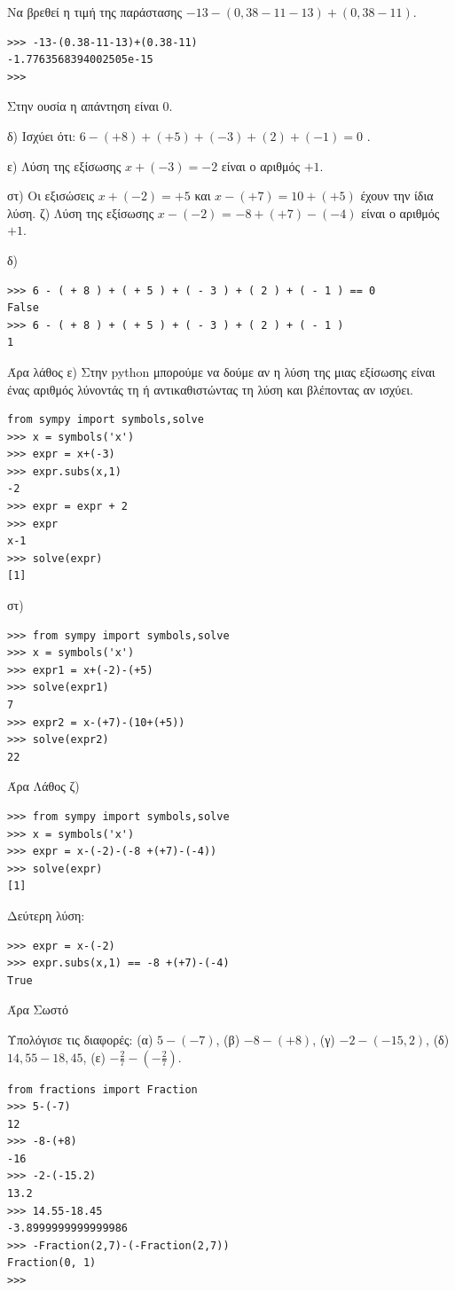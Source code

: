 \begin{exercise}
Να βρεθεί η τιμή της παράστασης $-13-(0,38-11-13)+(0,38-11)$.
\end{exercise}
\begin{lstlisting}
>>> -13-(0.38-11-13)+(0.38-11)
-1.7763568394002505e-15
>>> 
\end{lstlisting}
Στην ουσία η απάντηση είναι 0.
\begin{exercise}
δ) Ισχύει  ότι:    $ 6 - ( + 8 ) + ( + 5 ) + ( - 3 ) + ( 2 ) + ( - 1 ) = 0 $ .

ε) Λύση    της εξίσωσης    $x+(-3) = -2$  είναι   ο   αριθμός $+1$.   

στ) Οι  εξισώσεις  $x+(-2)=+5$   και $x-(+7)=10+(+5)$ έχουν   την
         ίδια   λύση.
ζ) Λύση της εξίσωσης    $x- (-2)$    = $-8  +   (+7) - (-4)$    είναι   ο   αριθμός $+1$.
\end{exercise}
δ)
\begin{lstlisting}
>>> 6 - ( + 8 ) + ( + 5 ) + ( - 3 ) + ( 2 ) + ( - 1 ) == 0
False
>>> 6 - ( + 8 ) + ( + 5 ) + ( - 3 ) + ( 2 ) + ( - 1 )
1
\end{lstlisting}
Άρα λάθος
ε) Στην python μπορούμε να δούμε αν η λύση της μιας εξίσωσης είναι ένας αριθμός λύνοντάς τη ή αντικαθιστώντας τη λύση και βλέποντας αν ισχύει.
\begin{lstlisting}
from sympy import symbols,solve
>>> x = symbols('x')
>>> expr = x+(-3)
>>> expr.subs(x,1)
-2
>>> expr = expr + 2
>>> expr
x-1
>>> solve(expr)
[1]
\end{lstlisting}
στ) 
\begin{lstlisting}
>>> from sympy import symbols,solve
>>> x = symbols('x')
>>> expr1 = x+(-2)-(+5)
>>> solve(expr1)
7
>>> expr2 = x-(+7)-(10+(+5))
>>> solve(expr2)
22
\end{lstlisting}
Άρα Λάθος
ζ)
\begin{lstlisting}
>>> from sympy import symbols,solve
>>> x = symbols('x')
>>> expr = x-(-2)-(-8 +(+7)-(-4))
>>> solve(expr)
[1]
\end{lstlisting}
Δεύτερη λύση:
\begin{lstlisting}
>>> expr = x-(-2)
>>> expr.subs(x,1) == -8 +(+7)-(-4)
True
\end{lstlisting}
Άρα Σωστό
\begin{exercise}
Υπολόγισε   τις διαφορές:
(α) $5-(-7)$,   (β) $-8-(+8)$,   (γ) $-2-(-15,2)$,    (δ) $14,55-18,45$,  (ε) $-\frac{2}{7} - \left(-\frac{2}{7} \right)$.
\end{exercise}
\begin{lstlisting}
from fractions import Fraction
>>> 5-(-7)
12
>>> -8-(+8)
-16
>>> -2-(-15.2)
13.2
>>> 14.55-18.45
-3.8999999999999986
>>> -Fraction(2,7)-(-Fraction(2,7))
Fraction(0, 1)
>>>
\end{lstlisting}
